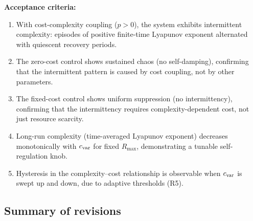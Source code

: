\textbf{Acceptance criteria:}
\begin{enumerate}
  \item With cost-complexity coupling ($p>0$), the system exhibits
        intermittent complexity: episodes of positive finite-time Lyapunov
        exponent alternated with quiescent recovery periods.
  \item The zero-cost control shows sustained chaos (no self-damping),
        confirming that the intermittent pattern is caused by cost coupling,
        not by other parameters.
  \item The fixed-cost control shows uniform suppression (no intermittency),
        confirming that the intermittency requires complexity-dependent cost,
        not just resource scarcity.
  \item Long-run complexity (time-averaged Lyapunov exponent) decreases
        monotonically with $c_{\rm var}$ for fixed $R_{\max}$, demonstrating
        a tunable self-regulation knob.
  \item Hysteresis in the complexity--cost relationship is observable when
        $c_{\rm var}$ is swept up and down, due to adaptive thresholds (R5).
\end{enumerate}

\subsection*{Summary of revisions}

